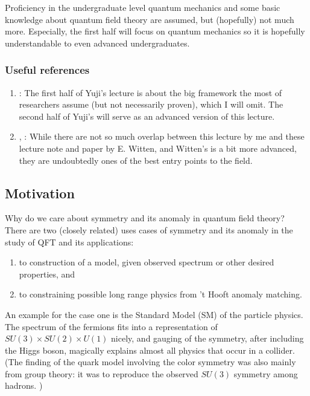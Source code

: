 \documentclass[
]{scrartcl}
\providecommand{\tightlist}{%
  \setlength{\itemsep}{0pt}\setlength{\parskip}{0pt}}
\begin{document}
Proficiency in the undergraduate level quantum mechanics and some basic knowledge about quantum field theory are assumed, but (hopefully) not much more. Especially, the first half will focus on quantum mechanics so it is hopefully understandable to even advanced undergraduates.

\hypertarget{useful-references}{%
\subsubsection{Useful references}\label{useful-references}}

\begin{enumerate}
\def\labelenumi{\arabic{enumi}.}
\tightlist
\item
  \textcite{tachikawa_2019}:
  The first half of Yuji's lecture is about the big framework the most of researchers assume (but not necessarily proven), which I will omit.
  The second half of Yuji's will serve as an advanced version of this lecture.
\item
  \textcite{Witten:2015aoa}, \textcite{Witten:2015aba}:
  While there are not so much overlap between this lecture by me and these lecture note and paper by E. Witten, and Witten's is a bit more advanced, they are undoubtedly ones of the best entry points to the field.
\end{enumerate}

\hypertarget{motivation}{%
\subsection{Motivation}\label{motivation}}

Why do we care about symmetry and its anomaly in quantum field theory?
There are two (closely related) uses cases of symmetry and its anomaly in the study of QFT and its applications:

\begin{enumerate}
\def\labelenumi{\arabic{enumi}.}
\tightlist
\item
  to construction of a model, given observed spectrum or other desired properties, and
\item
  to constraining possible long range physics from 't Hooft anomaly matching.
\end{enumerate}

An example for the case one is the Standard Model (SM) of the particle physics.
The spectrum of the fermions fits into a representation of \(SU(3)\times SU(2) \times U(1)\) nicely, and gauging of the symmetry, after including the Higgs boson, magically explains almost all physics that occur in a collider. (The finding of the quark model involving the color symmetry was also mainly from group theory: it was to reproduce the observed \(SU(3)\) symmetry among hadrons. )
\end{document}
